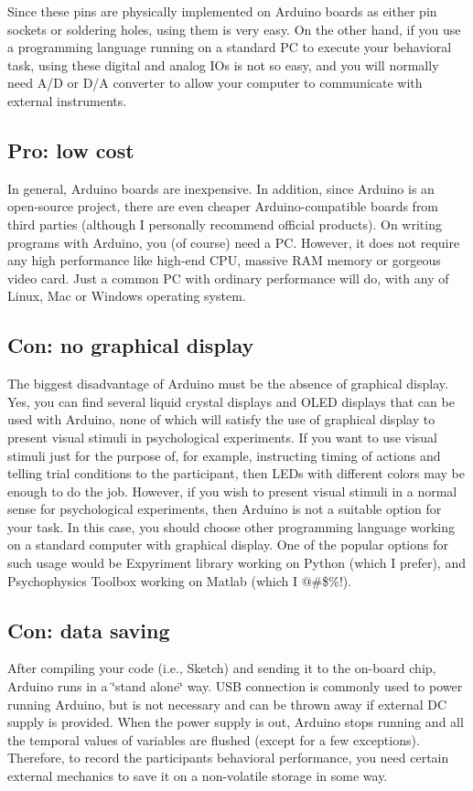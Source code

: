 Since these pins are physically implemented on Arduino boards as either pin sockets or soldering holes, using them is very easy. On the other hand, if you use a programming language running on a standard PC to execute your behavioral task, using these digital and analog I\+Os is not so easy, and you will normally need A/D or D/A converter to allow your computer to communicate with external instruments.\hypertarget{p1_ss3}{}\subsection{Pro\+: low cost}\label{p1_ss3}
In general, Arduino boards are inexpensive. In addition, since Arduino is an open-\/source project, there are even cheaper Arduino-\/compatible boards from third parties (although I personally recommend official products). On writing programs with Arduino, you (of course) need a PC. However, it does not require any high performance like high-\/end C\+PU, massive R\+AM memory or gorgeous video card. Just a common PC with ordinary performance will do, with any of Linux, Mac or Windows operating system.\hypertarget{p1_ss4}{}\subsection{Con\+: no graphical display}\label{p1_ss4}
The biggest disadvantage of Arduino must be the absence of graphical display. Yes, you can find several liquid crystal displays and O\+L\+ED displays that can be used with Arduino, none of which will satisfy the use of graphical display to present visual stimuli in psychological experiments. If you want to use visual stimuli just for the purpose of, for example, instructing timing of actions and telling trial conditions to the participant, then L\+E\+Ds with different colors may be enough to do the job. However, if you wish to present visual stimuli in a normal sense for psychological experiments, then Arduino is not a suitable option for your task. In this case, you should choose other programming language working on a standard computer with graphical display. One of the popular options for such usage would be Expyriment library working on Python (which I prefer), and Psychophysics Toolbox working on Matlab (which I @\#\$\%!).\hypertarget{p1_ss5}{}\subsection{Con\+: data saving}\label{p1_ss5}
After compiling your code (i.\+e., Sketch) and sending it to the on-\/board chip, Arduino runs in a \char`\"{}stand alone\char`\"{} way. U\+SB connection is commonly used to power running Arduino, but is not necessary and can be thrown away if external DC supply is provided. When the power supply is out, Arduino stops running and all the temporal values of variables are flushed (except for a few exceptions). Therefore, to record the participant\textquotesingle{}s behavioral performance, you need certain external mechanics to save it on a non-\/volatile storage in some way.

